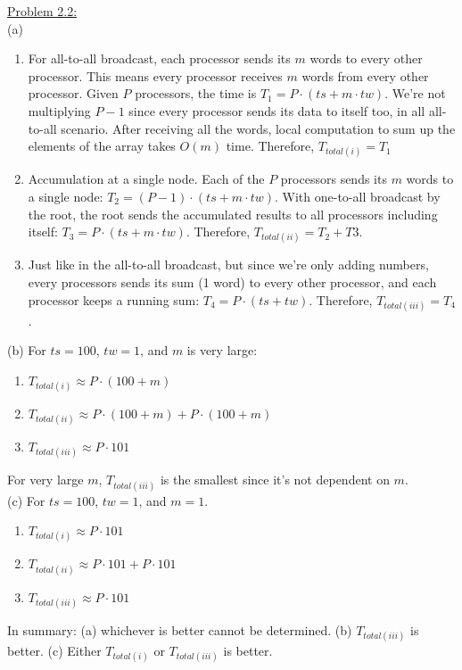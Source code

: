 \documentclass{article}
\begin{document}
\noindent \underline {Problem 2.2:}\\
\noindent (a)\\
\begin{enumerate}[label=(\roman*)]
    \item For all-to-all broadcast, each processor sends its $m$ words to every other processor.
        This means every processor receives $m$ words from every other processor. Given $P$
        processors, the time is $T_{1} = P \cdot (ts + m \cdot tw)$. We're not multiplying $P-1$
        since every processor sends its data to itself too, in all all-to-all scenario. After
        receiving all the words, local computation to sum up the elements of the array takes $O(m)$
        time. Therefore, $T_{total(i)} = T_{1}$
    \item Accumulation at a single node. Each of the $P$ processors sends its $m$ words to a single
        node: $T_{2} = (P - 1) \cdot (ts + m \cdot tw)$. With one-to-all broadcast by the root, the
        root sends the accumulated results to all processors including itself:
        $T_{3} = P \cdot (ts + m \cdot tw)$. Therefore, $T_{total(ii)}=  T_{2} + T{3}$.
    \item Just like in the all-to-all broadcast, but since we're only adding numbers, every
        processors sends its sum (1 word) to every other processor, and each processor keeps a
        running sum: $T_{4} = P \cdot (ts + tw)$. Therefore, $T_{total(iii)} = T_{4}$.
\end{enumerate}

\noindent (b) For $ts = 100$, $tw = 1$, and $m$ is very large:\\
\begin{enumerate}[label=(\roman*)]
    \item $T_{total(i)} \approx P \cdot (100 + m)$
    \item $T_{total(ii)} \approx P \cdot (100 + m) + P \cdot (100 + m)$
    \item $T_{total(iii)} \approx P \cdot 101$
\end{enumerate}
For very large $m$, $T_{total(iii)}$ is the smallest since it's not dependent on $m$.\\

\noindent (c) For $ts = 100$, $tw = 1$, and $m = 1$.\\
\begin{enumerate}[label=(\roman*)]
    \item $T_{total(i)} \approx P \cdot 101$
    \item $T_{total(ii)} \approx P \cdot 101 + P \cdot 101$
    \item $T_{total(iii)} \approx P \cdot 101$\\
\end{enumerate}
In summary: (a) whichever is better cannot be determined. (b) $T_{total(iii)}$ is better. (c) Either
$T_{total(i)}$ or $T_{total(iii)}$ is better.\\~\\
\end{document}
